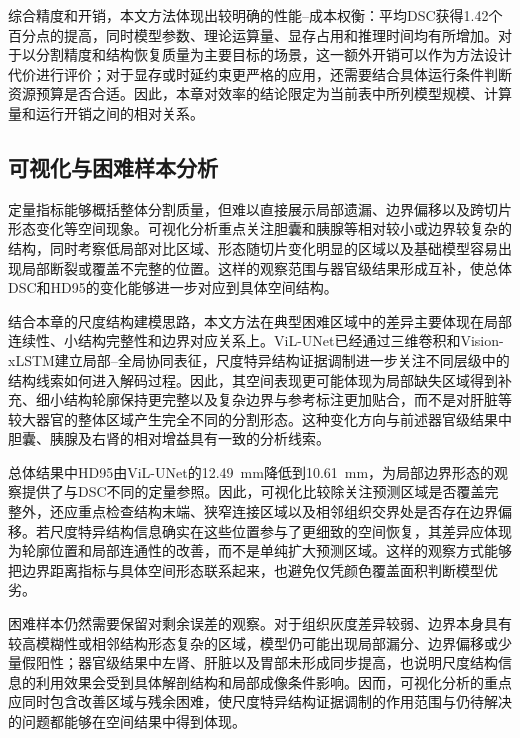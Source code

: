 综合精度和开销，本文方法体现出较明确的性能--成本权衡：平均DSC获得1.42个百分点的提高，同时模型参数、理论运算量、显存占用和推理时间均有所增加。对于以分割精度和结构恢复质量为主要目标的场景，这一额外开销可以作为方法设计代价进行评价；对于显存或时延约束更严格的应用，还需要结合具体运行条件判断资源预算是否合适。因此，本章对效率的结论限定为当前表中所列模型规模、计算量和运行开销之间的相对关系。

\subsection{可视化与困难样本分析}

定量指标能够概括整体分割质量，但难以直接展示局部遗漏、边界偏移以及跨切片形态变化等空间现象。可视化分析重点关注胆囊和胰腺等相对较小或边界较复杂的结构，同时考察低局部对比区域、形态随切片变化明显的区域以及基础模型容易出现局部断裂或覆盖不完整的位置。这样的观察范围与器官级结果形成互补，使总体DSC和HD95的变化能够进一步对应到具体空间结构。

结合本章的尺度结构建模思路，本文方法在典型困难区域中的差异主要体现在局部连续性、小结构完整性和边界对应关系上。ViL-UNet已经通过三维卷积和Vision-xLSTM建立局部--全局协同表征，尺度特异结构证据调制进一步关注不同层级中的结构线索如何进入解码过程。因此，其空间表现更可能体现为局部缺失区域得到补充、细小结构轮廓保持更完整以及复杂边界与参考标注更加贴合，而不是对肝脏等较大器官的整体区域产生完全不同的分割形态。这种变化方向与前述器官级结果中胆囊、胰腺及右肾的相对增益具有一致的分析线索。

总体结果中HD95由ViL-UNet的12.49~mm降低到10.61~mm，为局部边界形态的观察提供了与DSC不同的定量参照。因此，可视化比较除关注预测区域是否覆盖完整外，还应重点检查结构末端、狭窄连接区域以及相邻组织交界处是否存在边界偏移。若尺度特异结构信息确实在这些位置参与了更细致的空间恢复，其差异应体现为轮廓位置和局部连通性的改善，而不是单纯扩大预测区域。这样的观察方式能够把边界距离指标与具体空间形态联系起来，也避免仅凭颜色覆盖面积判断模型优劣。

困难样本仍然需要保留对剩余误差的观察。对于组织灰度差异较弱、边界本身具有较高模糊性或相邻结构形态复杂的区域，模型仍可能出现局部漏分、边界偏移或少量假阳性；器官级结果中左肾、肝脏以及胃部未形成同步提高，也说明尺度结构信息的利用效果会受到具体解剖结构和局部成像条件影响。因而，可视化分析的重点应同时包含改善区域与残余困难，使尺度特异结构证据调制的作用范围与仍待解决的问题都能够在空间结果中得到体现。

